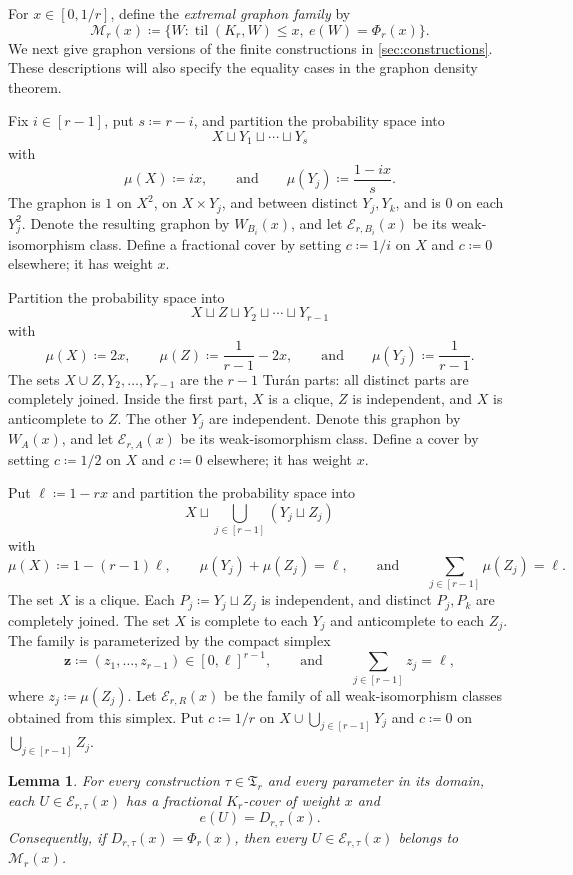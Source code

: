 \documentclass[10pt]{article}
\numberwithin{equation}{section}
\newtheorem{lemma}[lemma]{Lemma}
\newcommand{\til}{\operatorname{til}}
\newcommand{\vct}[1]{\boldsymbol{#1}}
\newcommand{\cE}{\mathcal E}
\newcommand{\cM}{\mathcal M}
\begin{document}
For $x\in[0,1/r]$, define the \emph{extremal graphon family} by
\begin{equation}\label{eq:Mrx}
 \cM_r(x)\coloneqq\{W\colon \til(K_r,W)\le x,\ e(W)=\Phi_r(x)\}.
\end{equation}
We next give graphon versions of the finite constructions in \cref{sec:constructions}.  These descriptions will also specify the equality cases in the graphon density theorem.

Fix $i\in[r-1]$, put $s\coloneqq r-i$, and partition the probability space into
\[
 X\sqcup Y_1\sqcup\cdots\sqcup Y_s
\]
with
\[
 \mu(X)\coloneqq ix,
 \qquad\text{and}\qquad
 \mu(Y_j)\coloneqq\frac{1-ix}{s}.
\]
The graphon is $1$ on $X^2$, on $X\times Y_j$, and between distinct $Y_j,Y_k$, and is $0$ on each $Y_j^2$.  Denote the resulting graphon by $W_{B_i}(x)$, and let $\cE_{r,B_i}(x)$ be its weak-isomorphism class.  Define a fractional cover by setting $c\coloneqq1/i$ on $X$ and $c\coloneqq0$ elsewhere; it has weight $x$.

Partition the probability space into
\[
 X\sqcup Z\sqcup Y_2\sqcup\cdots\sqcup Y_{r-1}
\]
with
\[
 \mu(X)\coloneqq2x,
 \qquad
 \mu(Z)\coloneqq\frac1{r-1}-2x,
 \qquad\text{and}\qquad
 \mu(Y_j)\coloneqq\frac1{r-1}.
\]
The sets $X\cup Z,Y_2,\ldots,Y_{r-1}$ are the $r-1$ Tur\'an parts: all distinct parts are completely joined.  Inside the first part, $X$ is a clique, $Z$ is independent, and $X$ is anticomplete to $Z$.  The other $Y_j$ are independent.  Denote this graphon by $W_A(x)$, and let $\cE_{r,A}(x)$ be its weak-isomorphism class.  Define a cover by setting $c\coloneqq1/2$ on $X$ and $c\coloneqq0$ elsewhere; it has weight $x$.

Put $\ell\coloneqq1-rx$ and partition the probability space into
\[
 X\sqcup\bigcup_{j\in[r-1]}(Y_j\sqcup Z_j)
\]
with
\[
 \mu(X)\coloneqq1-(r-1)\ell,
 \qquad
 \mu(Y_j)+\mu(Z_j)=\ell,
 \qquad\text{and}\qquad
 \sum_{j\in[r-1]}\mu(Z_j)=\ell.
\]
The set $X$ is a clique.  Each $P_j\coloneqq Y_j\sqcup Z_j$ is independent, and distinct $P_j,P_k$ are completely joined.  The set $X$ is complete to each $Y_j$ and anticomplete to each $Z_j$.  The family is parameterized by the compact simplex
\[
 \vct z\coloneqq(z_1,\ldots,z_{r-1})\in[0,\ell]^{r-1},
 \qquad\text{and}\qquad
 \sum_{j\in[r-1]}z_j=\ell,
\]
where $z_j\coloneqq\mu(Z_j)$.  Let $\cE_{r,R}(x)$ be the family of all weak-isomorphism classes obtained from this simplex.  Put $c\coloneqq1/r$ on $X\cup\bigcup_{j\in[r-1]}Y_j$ and $c\coloneqq0$ on $\bigcup_{j\in[r-1]}Z_j$.

\begin{lemma}\label{lem:construction-validity}
For every construction $\tau\in\mathfrak T_r$ and every parameter in its domain, each $U\in\cE_{r,\tau}(x)$ has a fractional $K_r$-cover of weight $x$ and
\[
 e(U)=D_{r,\tau}(x).
\]
Consequently, if $D_{r,\tau}(x)=\Phi_r(x)$, then every $U\in\cE_{r,\tau}(x)$ belongs to $\cM_r(x)$.
\end{lemma}
\end{document}
